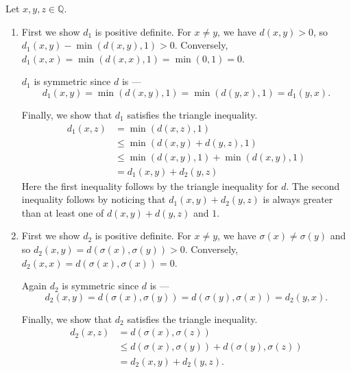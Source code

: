 \documentclass[12 pt, letterpaper]{hmcpset}
\begin{document}
\begin{solution}
	Let $x, y, z \in \mathbb{Q}$.
	\begin{enumerate}
		\item First we show $d_{1}$ is positive definite. For $x \neq y$, we have $d(x, y) > 0$, so $d_{1}(x, y) - \min(d(x, y), 1) > 0$. Conversely, $d_{1}(x, x) = \min(d(x, x), 1) = \min(0, 1) = 0$.

			$d_{1}$ is symmetric since $d$ is ---
			\[
				d_{1}(x, y) = \min(d(x, y), 1) = \min(d(y, x), 1) = d_{1}(y, x).
			\]

			Finally, we show that $d_{1}$ satisfies the triangle inequality.
			\begin{align*}
				d_{1}(x, z) & = \min(d(x, z), 1) \\
					    & \le \min(d(x, y) + d(y, z), 1) \\
					    & \le \min(d(x, y), 1) + \min(d(x, y), 1) \\
					    & = d_{1}(x, y) + d_{2}(y, z)
			\end{align*}
			Here the first inequality follows by the triangle inequality for $d$. The second inequality follows by noticing that $d_{1}(x, y) + d_{2}(y, z)$ is always greater than at least one of $d(x, y) + d(y, z)$ and $1$.

		\item First we show $d_{2}$ is positive definite. For $x \neq y$, we have $\sigma(x) \neq \sigma(y)$ and so $d_{2}(x, y) = d(\sigma(x), \sigma(y)) > 0$. Conversely, $d_{2}(x, x) = d(\sigma(x), \sigma(x)) =  0$.

			Again $d_{2}$ is symmetric since $d$ is ---
			\[
				d_{2}(x, y) = d(\sigma(x), \sigma(y)) = d(\sigma(y), \sigma(x)) = d_{2}(y, x).
			\]

			Finally, we show that $d_{2}$ satisfies the triangle inequality.
			\begin{align*}
				d_{2}(x, z) & = d(\sigma(x), \sigma(z)) \\
					    & \le d(\sigma(x), \sigma(y)) + d(\sigma(y), \sigma(z)) \\
					    & = d_{2}(x, y) + d_{2}(y, z).
			\end{align*}
	\end{enumerate}
\end{solution}
\end{document}
